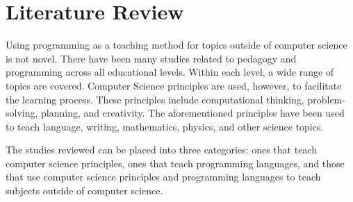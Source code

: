 
\section{Literature Review}










Using programming as a teaching method for topics outside of computer science is not novel.
There have been many studies related to pedagogy and programming across all educational levels.
Within each level, a wide range of topics are covered.
Computer Science principles are used, however, to facilitate the learning process.
These principles include computational thinking, problem-solving, planning, and creativity.
The aforementioned principles have been used to teach language, writing, mathematics, physics, and other science topics.

The studies reviewed can be placed into three categories: ones that teach computer science principles, ones that teach programming languages, and those that use computer science principles and programming languages to teach subjects outside of computer science.

